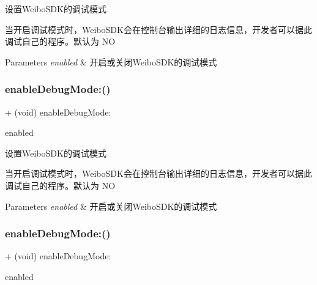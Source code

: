 设置\+Weibo\+S\+D\+K的调试模式

当开启调试模式时，\+Weibo\+S\+D\+K会在控制台输出详细的日志信息，开发者可以据此调试自己的程序。默认为 NO 
\begin{DoxyParams}{Parameters}
{\em enabled} & 开启或关闭\+Weibo\+S\+D\+K的调试模式 \\
\hline
\end{DoxyParams}
\mbox{\label{interface_weibo_s_d_k_a34fc58188a69b4585b4f49cda4f3cc17}} 
\subsubsection{\texorpdfstring{enable\+Debug\+Mode\+:()}{enableDebugMode:()}\hspace{0.1cm}{\footnotesize\ttfamily [2/3]}}
{\footnotesize\ttfamily + (void) enable\+Debug\+Mode\+: \begin{DoxyParamCaption}\item[{(B\+O\+OL)}]{enabled }\end{DoxyParamCaption}}

设置\+Weibo\+S\+D\+K的调试模式

当开启调试模式时，\+Weibo\+S\+D\+K会在控制台输出详细的日志信息，开发者可以据此调试自己的程序。默认为 NO 
\begin{DoxyParams}{Parameters}
{\em enabled} & 开启或关闭\+Weibo\+S\+D\+K的调试模式 \\
\hline
\end{DoxyParams}
\mbox{\label{interface_weibo_s_d_k_a34fc58188a69b4585b4f49cda4f3cc17}} 
\subsubsection{\texorpdfstring{enable\+Debug\+Mode\+:()}{enableDebugMode:()}\hspace{0.1cm}{\footnotesize\ttfamily [3/3]}}
{\footnotesize\ttfamily + (void) enable\+Debug\+Mode\+: \begin{DoxyParamCaption}\item[{(B\+O\+OL)}]{enabled }\end{DoxyParamCaption}}

